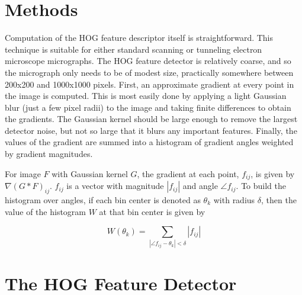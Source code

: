 \documentclass[review]{elsarticle}
\begin{document}
	

	\section{Methods}\label{methodsandmaterials}
		Computation of the HOG feature descriptor itself is straightforward. This technique is suitable for either standard scanning or tunneling electron microscope micrographs. The HOG feature detector is relatively coarse, and so the micrograph only needs to be of modest size, practically somewhere between 200x200 and 1000x1000 pixels. First, an approximate gradient at every point in the image is computed. This is most easily done by applying a light Gaussian blur (just a few pixel radii) to the image and taking finite differences to obtain the gradients. The Gaussian kernel should be large enough to remove the largest detector noise, but not so large that it blurs any important features. Finally, the values of the gradient are summed into a histogram of gradient angles weighted by gradient magnitudes.

		For image $F$ with Gaussian kernel $G$, the gradient at each point, $f_{ij}$, is given by $\nabla \left( G \ast F \right)_{ij}$. $f_{ij}$ is a vector with magnitude $\left| f_{ij} \right|$ and angle $\angle f_{ij}$. To build the histogram over angles, if each bin center is denoted as $\theta_k$ with radius $\delta$, then the value of the histogram $W$ at that bin center is given by

		\begin{equation}
			W \left( \theta_k \right) = \sum_{\left| \angle f_{ij} - \theta_k \right| < \delta} \left| f_{ij} \right|
		\end{equation}

	\section{The HOG Feature Detector}\label{hog}
\end{document}
